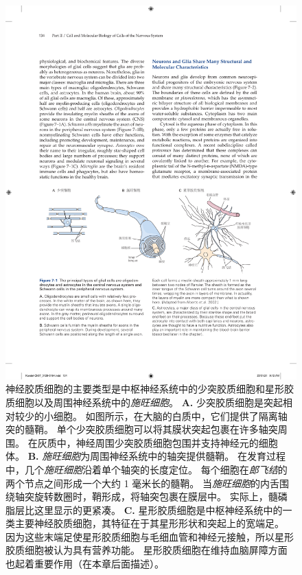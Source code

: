 \begin{figure}[htbp]
	\centering
	\includegraphics[width=1.0\linewidth]{chap07/fig_7_1}
	\caption{神经胶质细胞的主要类型是中枢神经系统中的少突胶质细胞和星形胶质细胞以及周围神经系统中的\textit{施旺细胞}。
		\textbf{A.} 少突胶质细胞是突起相对较少的小细胞。
		如图所示，在大脑的白质中，它们提供了隔离轴突的髓鞘。
		单个少突胶质细胞可以将其膜状突起包裹在许多轴突周围。
		在灰质中，神经周围少突胶质细胞包围并支持神经元的细胞体。
		\textbf{B.} \textit{施旺细胞}为周围神经系统中的轴突提供髓鞘。
		在发育过程中，几个\textit{施旺细胞}沿着单个轴突的长度定位。
		每个细胞在\textit{郎飞结}的两个节点之间形成一个大约 1 毫米长的髓鞘。
		当\textit{施旺细胞}的内舌围绕轴突旋转数圈时，鞘形成，将轴突包裹在膜层中。
		实际上，髓磷脂层比这里显示的更紧凑。
		\textbf{C.} 星形胶质细胞是中枢神经系统中的一类主要神经胶质细胞，其特征在于其星形形状和突起上的宽端足。 因为这些末端足使星形胶质细胞与毛细血管和神经元接触，所以星形胶质细胞被认为具有营养功能。 星形胶质细胞在维持血脑屏障方面也起着重要作用（在本章后面描述）。}
	\label{fig:7_1}
\end{figure}


